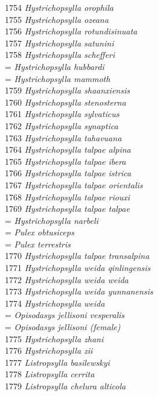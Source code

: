 \documentclass[
]{article}
\begin{document}
1754 \emph{Hystrichopsylla orophila}\\
1755 \emph{Hystrichopsylla ozeana}\\
1756 \emph{Hystrichopsylla rotundisinuata}\\
1757 \emph{Hystrichopsylla satunini}\\
1758 \emph{Hystrichopsylla schefferi}\\
= \emph{Hystrichopsylla hubbardi}\\
= \emph{Hystrichopsylla mammoth}\\
1759 \emph{Hystrichopsylla shaanxiensis}\\
1760 \emph{Hystrichopsylla stenosterna}\\
1761 \emph{Hystrichopsylla sylvaticus}\\
1762 \emph{Hystrichopsylla synaptica}\\
1763 \emph{Hystrichopsylla tahavuana}\\
1764 \emph{Hystrichopsylla talpae alpina}\\
1765 \emph{Hystrichopsylla talpae ibera}\\
1766 \emph{Hystrichopsylla talpae istrica}\\
1767 \emph{Hystrichopsylla talpae orientalis}\\
1768 \emph{Hystrichopsylla talpae riouxi}\\
1769 \emph{Hystrichopsylla talpae talpae}\\
= \emph{Hystrichopsylla narbeli}\\
= \emph{Pulex obtusiceps}\\
= \emph{Pulex terrestris}\\
1770 \emph{Hystrichopsylla talpae transalpina}\\
1771 \emph{Hystrichopsylla weida qinlingensis}\\
1772 \emph{Hystrichopsylla weida weida}\\
1773 \emph{Hystrichopsylla weida yunnanensis}\\
1774 \emph{Hystrichopsylla weida}\\
= \emph{Opisodasys jellisoni vesperalis}\\
= \emph{Opisodasys jellisoni (female)}\\
1775 \emph{Hystrichopsylla zhani}\\
1776 \emph{Hystrichopsylla zii}\\
1777 \emph{Listropsylla basilewskyi}\\
1778 \emph{Listropsylla cerrita}\\
1779 \emph{Listropsylla chelura alticola}\\
\end{document}
